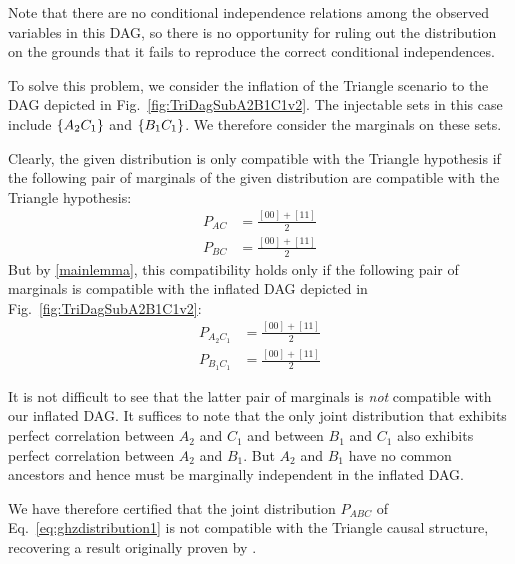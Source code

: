 Note that there are no conditional independence relations among the observed variables in this DAG, so there is no opportunity for ruling out the distribution on the grounds that it fails to reproduce the correct conditional independences. 


To solve this problem, we consider the inflation of the Triangle scenario to the DAG depicted in Fig.~\ref{fig:TriDagSubA2B1C1v2}.  
The injectable sets in this case include $\left\lbrace A_2 C_1\right\rbrace$ and $\left\lbrace B_1 C_1\right\rbrace$.  We therefore consider the marginals on these sets.

Clearly, the given distribution is only compatible with the Triangle hypothesis if the following pair of marginals of the given distribution are compatible with the Triangle hypothesis:
\begin{align}
P_{A C} &= \frac{[00]+[11]}{2}\label{j1}\\
P_{B C} &= \frac{[00]+[11]}{2}\label{j2}
\end{align}
But by \cref{mainlemma}, this compatibility holds only if the following pair of marginals is compatible with the inflated DAG depicted in Fig.~\ref{fig:TriDagSubA2B1C1v2}:
\begin{align}
P_{A_2 C_1} &= \frac{[00]+[11]}{2} \label{k1}\\
P_{B_1 C_1} &= \frac{[00]+[11]}{2} \label{k2}
\end{align}

It is not difficult to see that the latter pair of marginals is \emph{not} compatible with our inflated DAG. It suffices to note that the only joint distribution that exhibits perfect correlation between $A_2$ and $C_1$ and between $B_1$ and $C_1$ also exhibits perfect correlation between $A_2$ and $B_1$.  But $A_2$ and $B_1$ have no common ancestors and hence must be marginally independent in the inflated DAG.

We have therefore certified that the joint distribution $P_{A B C}$ of Eq.~\eqref{eq:ghzdistribution1} is not compatible with the Triangle causal structure, recovering a result originally proven by 
 \citet{steudel2010ancestors}.

